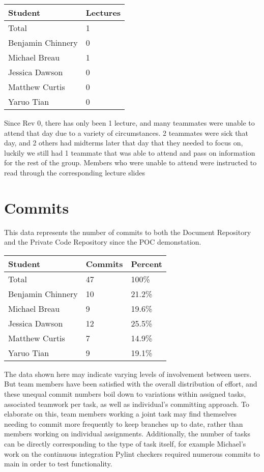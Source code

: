 \documentclass{article}
\begin{document}
\begin{table}[H]
\centering
\begin{tabular}{ll}
\toprule
\textbf{Student} & \textbf{Lectures}\\
\midrule
Total & 1\\
Benjamin Chinnery & 0\\
Michael Breau & 1\\
Jessica Dawson & 0\\
Matthew Curtis & 0\\
Yaruo Tian & 0\\
\bottomrule
\end{tabular}
\end{table}

Since Rev 0, there has only been 1 lecture, and many teammates were unable to attend that day due to a variety of circumstances. 2 teammates were sick that day, and 2 others had midterms later that day that they needed to focus on, luckily we still had 1 teammate that was able to attend and pass on information for the rest of the group. Members who were unable to attend were instructed to read through the corresponding lecture slides 

\section{Commits}

This data represents the number of commits to both the Document Repository and the Private Code Repository since the POC demonstation. 
\begin{table}[H]
\centering
\begin{tabular}{lll}
\toprule
\textbf{Student} & \textbf{Commits} & \textbf{Percent}\\
\midrule
Total & 47 & 100\% \\
Benjamin Chinnery & 10 & 21.2\%\\
Michael Breau & 9 & 19.6\%\\
Jessica Dawson & 12 & 25.5\%\\
Matthew Curtis & 7 & 14.9\%\\
Yaruo Tian & 9 & 19.1\%\\
\bottomrule
\end{tabular}
\end{table}

The data shown here may indicate varying levels of involvement between users. But team members have been satisfied with the overall distribution of effort, and these unequal commit numbers boil down to variations within assigned tasks, associated teamwork per task, as well as individual's committing approach. To elaborate on this, team members working a joint task may find themselves needing to commit more frequently to keep branches up to date, rather than members working on individual assignments. Additionally, the number of tasks can be directly corresponding to the type of task itself, for example Michael's work on the continuous integration Pylint checkers required numerous commits to main in order to test functionality.
\end{document}
